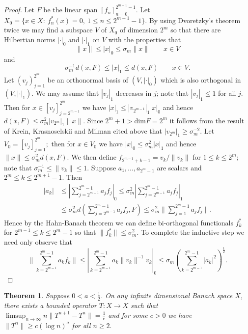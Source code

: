 \documentclass[12pt]{amsart}
\newtheorem{thm}{Theorem}[section]
\newcommand{\snormo}[1]{{\mathopen\|#1\mathclose\|}}
\begin{document}
\begin{proof}
  Let $F$ be the linear span $[f_n]_{n=0}^{2^{m-1}-1}.$  Let
$X_0=\{x\in X:\ f_n^*(x)=0, \ 1\le n\le 2^{m-1}-1\}$.  By using
Dvoretzky's theorem twice we may find a subspace $V$ of $X_0$ of
dimension $2^{m}$ so that there are Hilbertian norms $|\cdot|_0$
and $|\cdot|_1$ on $V$ with the properties that
$$ \|x\| \le |x|_0\le \sigma_m\|x\| \qquad x\in V$$ and
$$ \sigma_m^{-1} d(x,F) \le |x|_1\le d(x,F) \qquad x\in V.$$
Let $(v_j)_{j=1}^{2^{m}}$ be an orthonormal basis of
$(V,|\cdot|_0)$ which is also orthogonal in $(V,|\cdot|_1).$ We
may assume that $|v_j|_1$ decreases in $j$; note that $|v_j|_1\le
1$ for all $j.$ Then for $x\in [v_j]_{j=2^{m-1}}^{2^{m}}$ we have
$|x|_1\le |v_{2^{m-1}}|_1|x|_0$ and hence $d(x,F)\le
\sigma_m^2|v_{2^m}|_1\|x\|.$ Since $2^m+1>\text{dim} F=2^m$ it
follows from the result of Krein, Krasnoselskii and Milman cited
above that $|v_{2^m}|_1\ge \sigma_m^{-2}.$ Let
$V_0=[v_j]_{j=1}^{2^m};$ then for $x\in V_0$ we have $|x|_0\le
\sigma_m^2|x|_1$ and hence $\|x\|\le \sigma_m^2d(x,F).$ We then
define $f_{2^{m-1}+k-1}=v_k/\|v_k\|$ for $1\le k\le 2^m;$ note
that $\sigma_m^{-1}\le \|v_k\|\le 1.$ Suppose
$a_1,\ldots,a_{2^{m}-1}$ are scalars and $2^m\le k\le 2^{m+1}-1.$
Then
\begin{align*} |a_k| &\le
|\sum_{j=2^{m-1}}^{2^{m}-1}a_jf_{j}|_0
\le \sigma_m^2|\sum_{j=2^{m-1}}^{2^{m}-1}a_jf_{j}|_1\\
&\le \sigma_m^2 d(\sum_{j=2^{m-1}}^{2^{m}-1}a_jf_{j},F)\le
\sigma_m^2 \|\sum_{j=1}^{2^{m}-1} a_j f_j\|.\end{align*} Hence by
the Hahn-Banach theorem we can define bi-orthogonal functionals
$f_k^*$ for $2^{m-1}\le k\le 2^{m}-1$ so that $\|f_k^*\|\le
\sigma_{m}^2.$  To complete the inductive step we need only
observe that
$$ \|\sum_{k=2^{m-1}}^{2^{m}-1}a_kf_k\|\le
|\sum_{k=2^{m-1}}^{2^{m}-1}a_k\|v_k\|^{-1}v_k|_0\le \sigma_m
(\sum_{k=2^{m-1}}^{2^{m}-1}|a_k|^2)^{\frac12}.$$
\end{proof}




\begin{thm}  Suppose $0<a<\frac12$.
On any infinite dimensional Banach space $X$, there exists a
bounded operator $T:X\to X$ such that $ \limsup_{n\to\infty}
n\snormo{T^{n+1}-T^n} =\frac1e$ and for some $c>0$ we have
$\|T^n\|\ge c(\log n)^{a}$ for all $n\ge 2.$
\end{thm}
\end{document}
